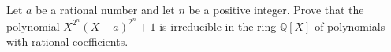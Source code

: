 Let $a$ be a rational number and let $n$ be a positive integer. Prove that the polynomial $X^{2^n}(X+a)^{2^n}+1$ is irreducible in the ring $\mathbb{Q}[X]$ of polynomials with rational coefficients.

